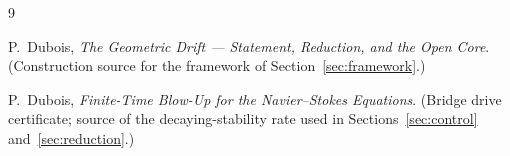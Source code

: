 \documentclass[11pt]{article}
\theoremstyle{plain}
\theoremstyle{definition}
\begin{document}
\begin{thebibliography}{9}\label{sec:bib}

P.~Dubois,
\emph{The Geometric Drift --- Statement, Reduction, and the Open Core}.
(Construction source for the framework of Section~\ref{sec:framework}.)

P.~Dubois,
\emph{Finite-Time Blow-Up for the Navier--Stokes Equations}.
(Bridge drive certificate; source of the decaying-stability rate used in
Sections~\ref{sec:control} and~\ref{sec:reduction}.)

\end{thebibliography}
\end{document}
